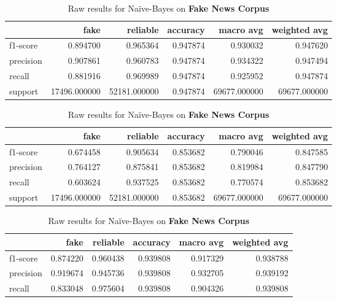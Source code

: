 \begin{table}
\begin{subtable}{\textwidth}
 \begin{tabular}{lrrrrr}
 \toprule
 {} &          fake &      reliable &  accuracy &     macro avg &  weighted avg \\
 \midrule
 f1-score  &      0.894700 &      0.965364 &  0.947874 &      0.930032 &      0.947620 \\
 precision &      0.907861 &      0.960783 &  0.947874 &      0.934322 &      0.947494 \\
 recall    &      0.881916 &      0.969989 &  0.947874 &      0.925952 &      0.947874 \\
 support   &  17496.000000 &  52181.000000 &  0.947874 &  69677.000000 &  69677.000000 \\
 \bottomrule
 \end{tabular}
 \caption{Raw results for Linear SVM on \textbf{Fake News Corpus}}
\end{subtable}
\begin{subtable}{\textwidth}
 \begin{tabular}{lrrrrr}
 \toprule
 {} &          fake &      reliable &  accuracy &     macro avg &  weighted avg \\
 \midrule
 f1-score  &      0.674458 &      0.905634 &  0.853682 &      0.790046 &      0.847585 \\
 precision &      0.764127 &      0.875841 &  0.853682 &      0.819984 &      0.847790 \\
 recall    &      0.603624 &      0.937525 &  0.853682 &      0.770574 &      0.853682 \\
 support   &  17496.000000 &  52181.000000 &  0.853682 &  69677.000000 &  69677.000000 \\
 \bottomrule
 \end{tabular}
 \caption{Raw results for Na\"{i}ve-Bayes on \textbf{Fake News Corpus}}
\end{subtable}
\begin{subtable}{\textwidth}
 \begin{tabular}{lrrrrr}
 \toprule
 {} &          fake &      reliable &  accuracy &     macro avg &  weighted avg \\
 \midrule
 f1-score  &      0.874220 &      0.960438 &  0.939808 &      0.917329 &      0.938788 \\
 precision &      0.919674 &      0.945736 &  0.939808 &      0.932705 &      0.939192 \\
 recall    &      0.833048 &      0.975604 &  0.939808 &      0.904326 &      0.939808 \\

\end{tabular}
\end{subtable}
\end{table}
